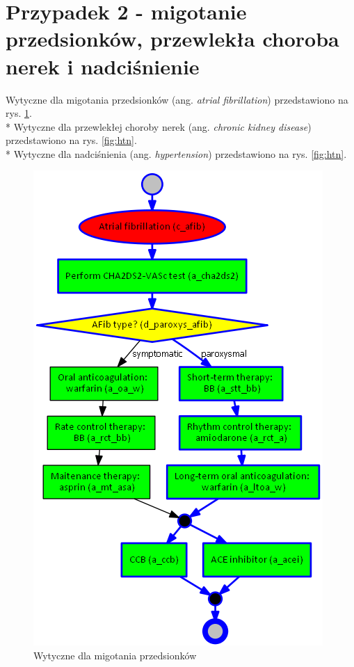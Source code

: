 \section{Przypadek 2 - migotanie przedsionków, przewlekła choroba nerek i nadciśnienie}
Wytyczne dla migotania przedsionków (ang. \textit{atrial fibrillation}) przedstawiono na rys. \ref{fig:afib}.\\*
Wytyczne dla przewlekłej choroby nerek (ang. \textit{chronic kidney disease}) przedstawiono na rys. \ref{fig:htn}.\\*
Wytyczne dla nadciśnienia (ang. \textit{hypertension}) przedstawiono na rys. \ref{fig:htn}.
\begin{figure}[H]
\centering
\includegraphics[scale=0.5]{img/afib-ver-4.png}
\caption{Wytyczne dla migotania przedsionków}
\label{fig:afib}
\end{figure}
\newpage
